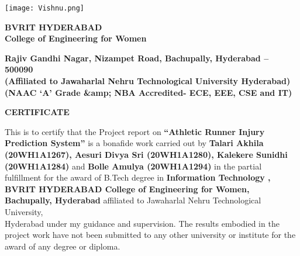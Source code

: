 \documentclass[12pt, English]{article}
\newcommand\tab[1][1cm]{\hspace*{#1}}
\begin{document}
\begin{titlepage}
\vspace*{-0.5in}
\begin{center}
\texttt{[image: Vishnu.png]}
\end{center}
\begin{center}
\begin{large}
\textbf{BVRIT HYDERABAD\\ College of Engineering for Women}\\
\end{large}
\begin{footnotesize}
\textbf{ Rajiv Gandhi Nagar, Nizampet Road, Bachupally, Hyderabad – 500090}\\
\vspace*{0.1in}
\textbf{(Affiliated to Jawaharlal Nehru Technological University Hyderabad)}\\
\textbf{(NAAC ‘A’ Grade \&amp; NBA Accredited- ECE, EEE, CSE and IT)}\\
\end{footnotesize}
\end{center}
\begin{center}
\textbf{\large CERTIFICATE}\\
\end{center}

\begin{normalsize}

This is to certify that the Project report on {\textbf{“Athletic Runner Injury Prediction System”}} is a bonafide work carried out by {\textbf{Talari Akhila (20WH1A1267), Aesuri Divya Sri (20WH1A1280), Kalekere Sunidhi (20WH1A1284)}} and {\textbf{Bolle Amulya (20WH1A1294)}} in the
partial fulfillment for the award of B.Tech degree in \textbf{Information Technology , BVRIT
HYDERABAD College of Engineering for Women, Bachupally, Hyderabad} affiliated to Jawaharlal
Nehru Technological University, \\Hyderabad under my guidance and supervision.
\newline
\tab The results embodied in the project work have not been submitted to any other university or
institute for the award of any degree or diploma.
\end{normalsize}
\vspace*{0.6in}


\end{titlepage}
\end{document}
